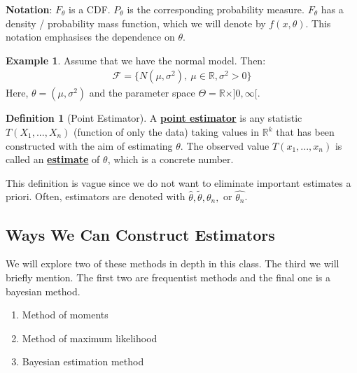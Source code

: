 \documentclass[11pt]{scrartcl}
\newcommand{\R}[0]{\mathbb{R}}
\theoremstyle{definition}
\newtheorem{definition}{Definition}
\newtheorem{ex}{Example}
\theoremstyle{remark}
\newcommand{\dfn}[1]{\textbf{\underline{#1}}}
\newcommand{\dist}[0]{\mathcal{F}}
\newcommand{\stat}[0]{T(X_1, ..., X_n )}
\begin{document}
{\textbf{Notation}: $F_\theta$ is a CDF. $P_\theta$ is the corresponding probability measure. $F_\theta$ has a density / probability mass function, which we will denote by $f(x, \theta)$. This notation emphasises the dependence on $\theta$. 


\begin{ex}
Assume that we have the normal model. Then: 
\begin{align*}
	\dist = \{ N(\mu, \sigma^2),\ \mu \in \R, \sigma^2 > 0 \} 	
\end{align*}
	Here, $\theta = (\mu, \sigma^2)$ and the parameter space $\Theta = \R \times ]0, \infty[$. 
\end{ex}

\begin{definition}[Point Estimator]
	A \dfn{point estimator} is any statistic $\stat$ (function of only the data) taking values in $\R^k$ that has been constructed with the aim of estimating $\theta$. The observed value $T(x_1, ..., x_n)$ is called an \dfn{estimate} of $\theta$, which is a concrete number. 
\end{definition}

This definition is vague since we do not want to eliminate important estimates a priori. Often, estimators are denoted with $\hat{\theta}, \tilde{\theta}, \theta_n,$ or $ \hat{\theta_n}$. 


\subsection{Ways We Can Construct Estimators}
We will explore two of these methods in depth in this class. The third we will briefly mention. The first two are frequentist methods and the final one is a bayesian method. 
\begin{enumerate}[noitemsep]
	\item Method of moments
	\item Method of maximum likelihood 
	\item Bayesian estimation method 
\end{enumerate}

}
\end{document}
